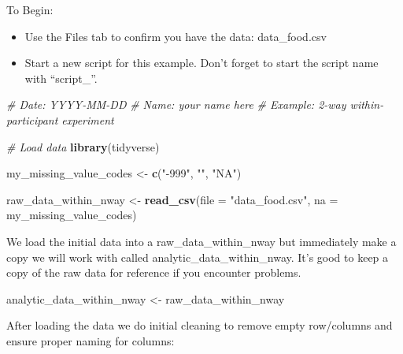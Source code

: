 \documentclass[
]{krantz}
\makeatletter
\newenvironment{Shaded}{\begin{snugshade}}{\end{snugshade}}
\newcommand{\CommentTok}[1]{\textcolor[rgb]{0.37,0.37,0.37}{\textit{#1}}}
\newcommand{\DataTypeTok}[1]{\textcolor[rgb]{0.27,0.27,0.27}{#1}}
\newcommand{\KeywordTok}[1]{\textcolor[rgb]{0.27,0.27,0.27}{\textbf{#1}}}
\newcommand{\NormalTok}[1]{#1}
\newcommand{\OperatorTok}[1]{\textcolor[rgb]{0.43,0.43,0.43}{\textbf{#1}}}
\newcommand{\StringTok}[1]{\textcolor[rgb]{0.5,0.5,0.5}{#1}}
\newenvironment{kframe}{%
\medskip{}
\setlength{\fboxsep}{.8em}
 \def\at@end@of@kframe{}%
 \ifinner\ifhmode%
  \def\at@end@of@kframe{\end{minipage}}%
  \begin{minipage}{\columnwidth}%
 \fi\fi%
 \def\FrameCommand##1{\hskip\@totalleftmargin \hskip-\fboxsep
 \colorbox{shadecolor}{##1}\hskip-\fboxsep
     \hskip-\linewidth \hskip-\@totalleftmargin \hskip\columnwidth}%
 \MakeFramed {\advance\hsize-\width
   \@totalleftmargin\z@ \linewidth\hsize
   \@setminipage}}%
 {\par\unskip\endMakeFramed%
 \at@end@of@kframe}
\renewenvironment{Shaded}{\begin{kframe}}{\end{kframe}}
\makeatother
\begin{document}
To Begin:

\begin{itemize}
\item
  Use the Files tab to confirm you have the data: data\_food.csv
\item
  Start a new script for this example. Don't forget to start the script name with ``script\_''.
\end{itemize}

\begin{Shaded}
\begin{Highlighting}[]
\CommentTok{# Date: YYYY-MM-DD}
\CommentTok{# Name: your name here}
\CommentTok{# Example: 2-way within-participant experiment}

\CommentTok{# Load data}
\KeywordTok{library}\NormalTok{(tidyverse)}

\NormalTok{my_missing_value_codes <-}\StringTok{ }\KeywordTok{c}\NormalTok{(}\StringTok{"-999"}\NormalTok{, }\StringTok{""}\NormalTok{, }\StringTok{"NA"}\NormalTok{)}

\NormalTok{raw_data_within_nway <-}\StringTok{ }\KeywordTok{read_csv}\NormalTok{(}\DataTypeTok{file =} \StringTok{"data_food.csv"}\NormalTok{,}
                     \DataTypeTok{na =}\NormalTok{ my_missing_value_codes)}
\end{Highlighting}
\end{Shaded}

We load the initial data into a raw\_data\_within\_nway but immediately make a copy we will work with called analytic\_data\_within\_nway. It's good to keep a copy of the raw data for reference if you encounter problems.

\begin{Shaded}
\begin{Highlighting}[]
\NormalTok{analytic_data_within_nway <-}\StringTok{ }\NormalTok{raw_data_within_nway}
\end{Highlighting}
\end{Shaded}

After loading the data we do initial cleaning to remove empty row/columns and ensure proper naming for columns:

\begin{Shaded}
\end{Shaded}
\end{document}
